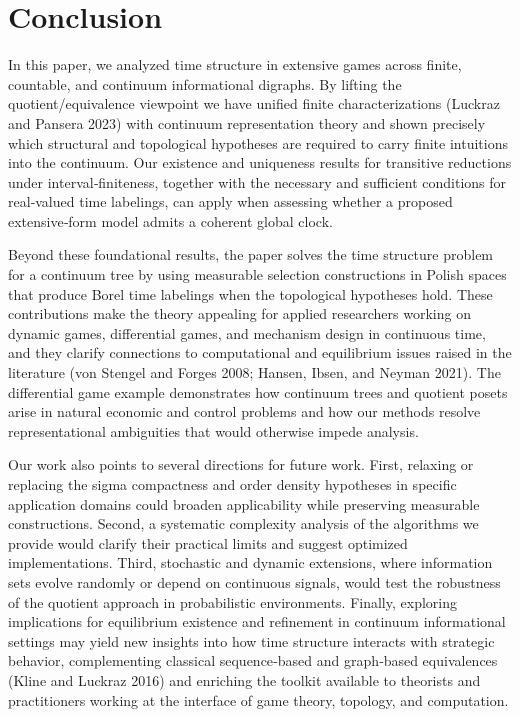 \documentclass[11pt]{article}
\begin{document}
\section{Conclusion}

In this paper, we analyzed time structure in extensive games across finite, countable, and continuum informational digraphs. By lifting the quotient/equivalence viewpoint we have unified finite characterizations (Luckraz and Pansera 2023) with continuum representation theory and shown precisely which structural and topological hypotheses are required to carry finite intuitions into the continuum. Our existence and uniqueness results for transitive reductions under interval‑finiteness, together with the necessary and sufficient conditions for real‑valued time labelings, can apply when assessing whether a proposed extensive‑form model admits a coherent global clock.

Beyond these foundational results, the paper solves the time structure problem for a continuum tree by using  measurable selection constructions in Polish spaces that produce Borel time labelings when the topological hypotheses hold. These contributions make the theory appealing  for applied researchers working on dynamic games, differential games, and mechanism design in continuous time, and they clarify connections to computational and equilibrium issues raised in the literature (von Stengel and Forges 2008; Hansen, Ibsen, and Neyman 2021). The differential game example demonstrates how continuum trees and quotient posets arise in natural economic and control problems and how our methods resolve representational ambiguities that would otherwise impede analysis.

Our work also points to several directions for future work. First, relaxing or replacing the sigma compactness and order density hypotheses in specific application domains could broaden applicability while preserving measurable constructions. Second, a systematic complexity analysis of the algorithms we provide would clarify their practical limits and suggest optimized implementations. Third, stochastic and dynamic extensions, where information sets evolve randomly or depend on continuous signals, would test the robustness of the quotient approach in probabilistic environments. Finally, exploring implications for equilibrium existence and refinement in continuum informational settings may yield new insights into how time structure interacts with strategic behavior, complementing classical sequence‑based and graph‑based equivalences (Kline and Luckraz 2016) and enriching the toolkit available to theorists and practitioners working at the interface of game theory, topology, and computation.
\end{document}
